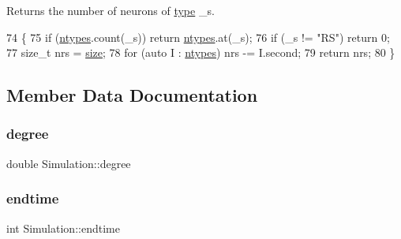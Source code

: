Returns the number of neurons of \hyperlink{classNeuron_ab4b47274e756b72923d2f8a9a5037d23}{type} \+\_\+s. 
\begin{DoxyCode}
74                                                       \{
75     \textcolor{keywordflow}{if} (\hyperlink{classSimulation_a445d67187d6cc08c4c098ca498ee87d7}{ntypes}.count(\_s)) \textcolor{keywordflow}{return} \hyperlink{classSimulation_a445d67187d6cc08c4c098ca498ee87d7}{ntypes}.at(\_s);
76     \textcolor{keywordflow}{if} (\_s != \textcolor{stringliteral}{"RS"})       \textcolor{keywordflow}{return} 0;
77     \textcolor{keywordtype}{size\_t} nrs = \hyperlink{classSimulation_ae198f9ac020ed6bc6ebbd608ab3f959d}{size};
78     \textcolor{keywordflow}{for} (\textcolor{keyword}{auto} I : \hyperlink{classSimulation_a445d67187d6cc08c4c098ca498ee87d7}{ntypes}) nrs -= I.second;
79     \textcolor{keywordflow}{return} nrs;
80 \}
\end{DoxyCode}


\subsection{Member Data Documentation}
\mbox{\label{classSimulation_ad0197878662d63d3ad1699aa7ffe01b2}} 
\subsubsection{\texorpdfstring{degree}{degree}}
{\footnotesize\ttfamily double Simulation\+::degree\hspace{0.3cm}{\ttfamily [private]}}

\mbox{\label{classSimulation_ae57735a4ad942d9d217fb2235a644d1b}} 
\subsubsection{\texorpdfstring{endtime}{endtime}}
{\footnotesize\ttfamily int Simulation\+::endtime\hspace{0.3cm}{\ttfamily [private]}}

\mbox{\label{classSimulation_a14c04fb020df35f875b1f5b2aab7a562}} 
